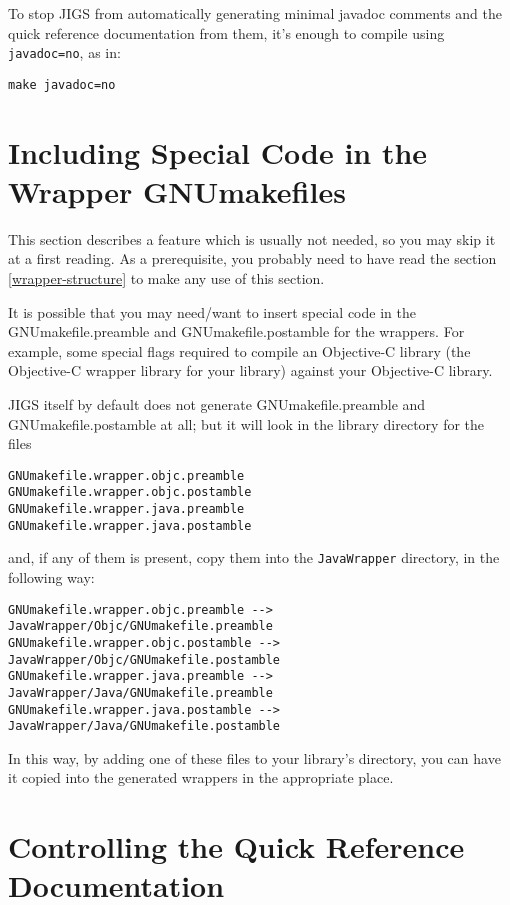 To stop JIGS from automatically generating minimal javadoc comments
and the quick reference documentation from them, it's enough to
compile using \texttt{javadoc=no}, as in:
\begin{verbatim}
make javadoc=no
\end{verbatim}

\section{Including Special Code in the Wrapper GNUmakefiles}\label{special-code-in-GNUmakefiles}

This section describes a feature which is usually not needed, so you
may skip it at a first reading.  As a prerequisite, you probably need
to have read the section \ref{wrapper-structure} to make any use of
this section.

It is possible that you may need/want to insert special code in the
GNUmakefile.preamble and GNUmakefile.postamble for the wrappers.  For
example, some special flags required to compile an Objective-C library
(the Objective-C wrapper library for your library) against your
Objective-C library.

JIGS itself by default does not generate GNUmakefile.preamble and
GNUmakefile.postamble at all; but it will look in the library
directory for the files 
\begin{verbatim}
GNUmakefile.wrapper.objc.preamble
GNUmakefile.wrapper.objc.postamble
GNUmakefile.wrapper.java.preamble
GNUmakefile.wrapper.java.postamble
\end{verbatim}
and, if any of them is present, copy them into the \texttt{JavaWrapper} 
directory, in the following way:
\begin{verbatim}
GNUmakefile.wrapper.objc.preamble --> JavaWrapper/Objc/GNUmakefile.preamble
GNUmakefile.wrapper.objc.postamble --> JavaWrapper/Objc/GNUmakefile.postamble
GNUmakefile.wrapper.java.preamble --> JavaWrapper/Java/GNUmakefile.preamble
GNUmakefile.wrapper.java.postamble --> JavaWrapper/Java/GNUmakefile.postamble
\end{verbatim}

In this way, by adding one of these files to your library's directory,
you can have it copied into the generated wrappers in the appropriate
place.

\section{Controlling the Quick Reference Documentation}

